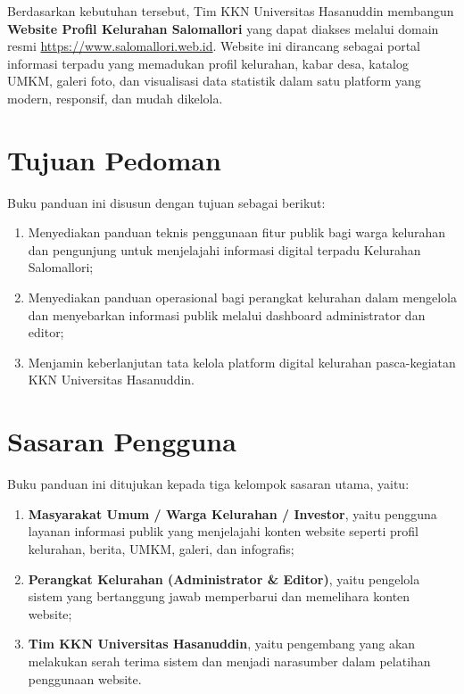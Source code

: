 \documentclass[12pt,a4paper]{report}
\begin{document}
Berdasarkan kebutuhan tersebut, Tim KKN Universitas Hasanuddin membangun \textbf{Website Profil Kelurahan Salomallori} yang dapat diakses melalui domain resmi \url{https://www.salomallori.web.id}. Website ini dirancang sebagai portal informasi terpadu yang memadukan profil kelurahan, kabar desa, katalog UMKM, galeri foto, dan visualisasi data statistik dalam satu platform yang modern, responsif, dan mudah dikelola.

\section{Tujuan Pedoman}

Buku panduan ini disusun dengan tujuan sebagai berikut:
\begin{enumerate}[leftmargin=2em, itemsep=2pt]
    \item Menyediakan panduan teknis penggunaan fitur publik bagi warga kelurahan dan pengunjung untuk menjelajahi informasi digital terpadu Kelurahan Salomallori;
    \item Menyediakan panduan operasional bagi perangkat kelurahan dalam mengelola dan menyebarkan informasi publik melalui dashboard administrator dan editor;
    \item Menjamin keberlanjutan tata kelola platform digital kelurahan pasca-kegiatan KKN Universitas Hasanuddin.
\end{enumerate}

\section{Sasaran Pengguna}

Buku panduan ini ditujukan kepada tiga kelompok sasaran utama, yaitu:
\begin{enumerate}[leftmargin=2em, itemsep=2pt]
    \item \textbf{Masyarakat Umum / Warga Kelurahan / Investor}, yaitu pengguna layanan informasi publik yang menjelajahi konten website seperti profil kelurahan, berita, UMKM, galeri, dan infografis;
    \item \textbf{Perangkat Kelurahan (Administrator \& Editor)}, yaitu pengelola sistem yang bertanggung jawab memperbarui dan memelihara konten website;
    \item \textbf{Tim KKN Universitas Hasanuddin}, yaitu pengembang yang akan melakukan serah terima sistem dan menjadi narasumber dalam pelatihan penggunaan website.
\end{enumerate}
\end{document}
